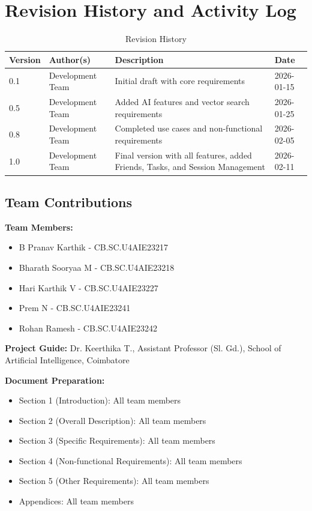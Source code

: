 \documentclass[11pt,a4paper]{article}
\begin{document}
\section{Revision History and Activity Log}

\begin{table}[H]
\centering
\begin{tabular}{p{2cm}p{3cm}p{5cm}p{2.5cm}}
\toprule
\textbf{Version} & \textbf{Author(s)} & \textbf{Description} & \textbf{Date} \\
\midrule
0.1 & Development Team & Initial draft with core requirements & 2026-01-15 \\
0.5 & Development Team & Added AI features and vector search requirements & 2026-01-25 \\
0.8 & Development Team & Completed use cases and non-functional requirements & 2026-02-05 \\
1.0 & Development Team & Final version with all features, added Friends, Tasks, and Session Management & 2026-02-11 \\
\bottomrule
\end{tabular}
\caption{Revision History}
\end{table}

\subsection{Team Contributions}

\textbf{Team Members:}
\begin{itemize}
    \item B Pranav Karthik - CB.SC.U4AIE23217
    \item Bharath Sooryaa M - CB.SC.U4AIE23218
    \item Hari Karthik V - CB.SC.U4AIE23227
    \item Prem N - CB.SC.U4AIE23241
    \item Rohan Ramesh - CB.SC.U4AIE23242
\end{itemize}

\textbf{Project Guide:} Dr. Keerthika T., Assistant Professor (Sl. Gd.), School of Artificial Intelligence, Coimbatore

\textbf{Document Preparation:}
\begin{itemize}
    \item Section 1 (Introduction): All team members
    \item Section 2 (Overall Description): All team members
    \item Section 3 (Specific Requirements): All team members
    \item Section 4 (Non-functional Requirements): All team members
    \item Section 5 (Other Requirements): All team members
    \item Appendices: All team members
\end{itemize}
\end{document}
